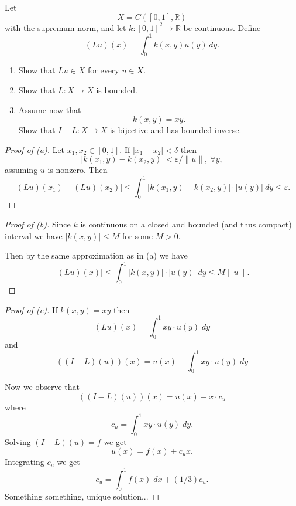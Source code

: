 \begin{prob}[Problem 3]
Let
\[
    X=C([0,1],\mathbb R)
\]
with the supremum norm, and let $k:[0,1]^2\to\mathbb R$ be continuous. Define
\[
    (Lu)(x)=\int_0^1 k(x,y)u(y)\,dy.
\]

\begin{enumerate}[label=\alph*)]
    \item Show that $Lu\in X$ for every $u\in X$.

    \item Show that $L:X\to X$ is bounded.

    \item Assume now that
    \[
        k(x,y)=xy.
    \]
    Show that $I-L:X\to X$ is bijective and has bounded inverse.
\end{enumerate}
\end{prob}

\begin{proof}[Proof of (a)]
    Let $x_1, x_2 \in [0,1]$. If $|x_1 - x_2| < \delta$ then 
    \[
        |k(x_1, y) - k(x_2, y)| < \varepsilon/\|u\|, \ \forall y,
    \]
    assuming $u$ is nonzero.
    Then 
    \[
        |(Lu)(x_1) - (Lu)(x_2)| \leq 
        \int_0^1 |k(x_1, y) - k(x_2, y)| \cdot |u(y)| \:dy 
        \leq \varepsilon.
    \]
\end{proof}

\begin{proof}[Proof of (b)]
    Since $k$ is continuous on a closed and bounded (and thus 
    compact) interval we have $|k(x,y)| \leq M$ for some 
    $M > 0$. 

    Then by the same approximation as in (a) we have 
    \[
        |(Lu)(x)| \leq \int_0^1 |k(x,y)| \cdot |u(y)| \: dy 
        \leq M \|u\|.
    \]
\end{proof}

\begin{proof}[Proof of (c)]
    If $k(x,y) = xy$ then 
    \[
        (Lu)(x) = \int_0^1 xy \cdot u(y) \; dy
    \]
    and 
    \[
        ((I - L)(u))(x) = 
        u(x) - \int_0^1 xy \cdot u(y) \; dy
    \]

    Now we observe that 
    \[
        ((I-L)(u))(x) = u(x) - x \cdot c_u
    \]
    where 
    \[
        c_u = \int_0^1 xy \cdot u(y) \; dy. 
    \]
    Solving $(I-L)(u) = f$ we get 
    \[
        u(x) = f(x) + c_u x. 
    \]
    Integrating $c_u$ we get 
    \[
        c_u = \int_0^1 f(x) \; dx + (1/3)c_u.
    \]
    Something something, unique solution...
\end{proof}


